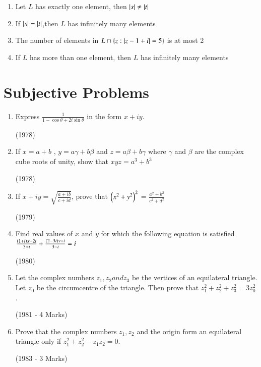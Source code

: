 \documentclass[journal,12pt,twocolumn]{IEEEtran}
\theoremstyle{remark}
\begin{document}
\begin{enumerate}
    \begin{enumerate}[label=(\alph*)]
    \item Let $ L $ has exactly one element, then $ \left\vert s\right\vert \ne \left\vert t\right\vert $
    \item If $ \left\vert s\right\vert = \left\vert t\right\vert $,then $ L $ has infinitely many elements 
    \item The number of elements in $ L \cap \left\{z:|z-1+i|=5\right\} $ is at most 2
    \item If $ L $  has more than one element, then $ L $ has infinitely many elements 
    \end{enumerate}

    \end{enumerate}

    \section{Subjective Problems}

    \begin{enumerate}
    
    \item Express $ \frac{1}{1-\cos\theta +2i\sin\theta} $ in the form $ x + iy $.

    \hfill (1978)

    \item If $ x = a + b $ , $ y = a\gamma + b\beta $ and $ z = a\beta + b\gamma $ where $ \gamma $ and $ \beta $ are the complex cube roots of unity, show that $ xyz = a^3 + b^3 $

    \hfill (1978)

    \item If $ x + iy =\sqrt{\frac{a + ib}{c + id}} $, prove that $ \left(x^2 + y^2\right)^2 $ = $ \frac{a^2 + b^2}{c^2 + d^2} $

    \hfill (1979)

    \item Find real values of $ x $ and $ y $ for which the following equation is satisfied $ \frac{\left(1 + i\right)x - 2i}{3 + i} + \frac{\left(2 - 3i\right)y + i}{3 - i} = i $

    \hfill (1980)

    \item Let the complex numbers $ z_1 , z_2 and z_3 $ be the vertices of an equilateral triangle. Let $ z_0 $ be the circumcentre of the triangle. Then prove that $ z_1^2 + z_2^2 + z_3^2 = 3z_0^2 $.

    \hfill (1981 - 4 Marks)

    \item Prove that the complex numbers $ z_1,z_2 $ and the origin form an equilateral triangle only if $ z_1^2 + z_2^2 - z_1z_2 = 0 $.

    \hfill (1983 - 3 Marks)
    \end{enumerate} 
    
    
\end{document}
